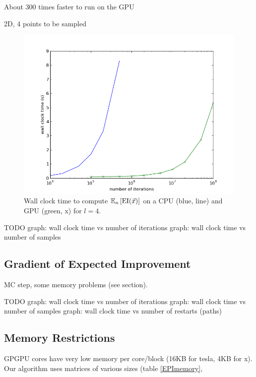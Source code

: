 \documentclass[phd,tocprelim]{cornell}
\begin{document}
About 300 times faster to run on the GPU

2D, 4 points to be sampled

 \begin{figure}[hpt]
 	\centerline{\includegraphics[width=\textwidth]{figures/EPI/exp_EI_speedup_vs_its.png}}
    \caption[CPU vs GPU time to compute EI]{Wall clock time to compute $\mathbb{E}_{n}\left[{\rm EI}(\vec{x})\right]$ on a CPU (blue, line) and GPU (green, x) for $l = 4$.}
 	\label{fig:00}
 \end{figure}

TODO
graph: wall clock time vs number of iterations
graph: wall clock time vs number of samples

\subsection{Gradient of Expected Improvement}

MC step, some memory problems (see section).

TODO
graph: wall clock time vs number of iterations
graph: wall clock time vs number of samples
graph: wall clock time vs number of restarts (paths)

\subsection{Memory Restrictions} %
\label{sub:Memory Restrictions}

GPGPU cores have very low memory per core/block (16KB for tesla, 4KB for x). Our algorithm uses matrices of various sizes (table \ref{EPImemory},
\end{document}
